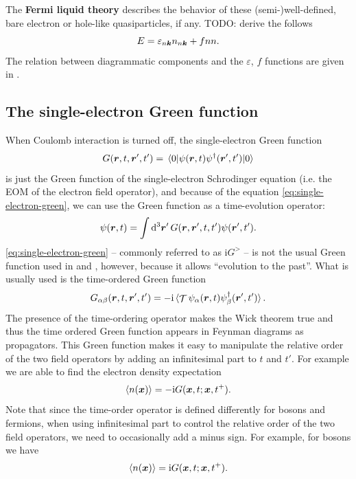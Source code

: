\documentclass[hyperref, a4paper, 12pt]{report}
\DeclareMathOperator{\timeorder}{\mathcal{T}}
\newcommand*{\ii}{\mathrm{i}}
\newcommand*{\concept}[1]{{\textbf{#1}}}
\begin{document}
The \concept{Fermi liquid theory} describes the behavior of these (semi-)well-defined, 
bare electron or hole-like quasiparticles, if any.  
TODO: derive the follows 
\begin{equation}
    E = \varepsilon_{n \vb*{k}} n_{n \vb*{k}} + f n n.
\end{equation}
The relation between diagrammatic components and the $\varepsilon$, $f$ functions 
are given in \cite{hedin1965new}.

\subsection{The single-electron Green function}

When Coulomb interaction is turned off, 
the single-electron Green function 
\begin{equation}
    G(\vb*{r}, t, \vb*{r}', t') = \expval*{\psi(\vb*{r}, t) \psi^\dagger(\vb*{r}', t')}{0}
    \label{eq:single-electron-green}
\end{equation}
is just the Green function of the single-electron Schrodinger equation
(i.e. the EOM of the electron field operator),
and because of the equation \eqref{eq:single-electron-green},
we can use the Green function as a time-evolution operator:
\begin{equation}
    \psi(\vb*{r}, t) = \int \dd[3]{\vb*{r}'} G(\vb*{r}, \vb*{r}', t, t') \psi(\vb*{r}', t').
\end{equation}
\eqref{eq:single-electron-green} -- commonly referred to as $\ii G^{>}$ -- 
is not the usual Green function used in 
 and ,
however, because it allows ``evolution to the past''.
What is usually used is the time-ordered Green function
\begin{equation}
    G_{\alpha \beta}(\vb*{r}, t, \vb*{r}', t') = - \ii \expval*{\timeorder \psi_\alpha(\vb*{r}, t) \psi^\dagger_\beta(\vb*{r}', t')}. 
\end{equation}
The presence of the time-ordering operator 
makes the Wick theorem true 
and thus the time ordered Green function 
appears in Feynman diagrams as propagators.
This Green function makes it easy to manipulate 
the relative order of the two field operators 
by adding an infinitesimal part to $t$ and $t'$. 
For example we are able to find the electron density expectation
\begin{equation}
    \expval{n(\vb*{x})} = - \ii G(\vb*{x}, t; \vb*{x}, t^+).
\end{equation}
Note that since the time-order operator 
is defined differently for bosons and fermions, 
when using infinitesimal part to control the relative order 
of the two field operators, 
we need to occasionally add a minus sign.
For example, for bosons we have 
\begin{equation}
    \expval{n(\vb*{x})} = \ii G(\vb*{x}, t; \vb*{x}, t^+).
\end{equation}
\end{document}
